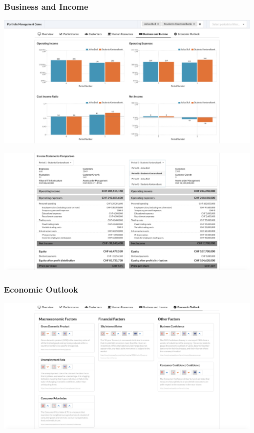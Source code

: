 \subsubsection{Business and Income}
\begin{center}
  \includegraphics[scale=0.2]{img/application-overview/reports/05_business_income.png}
\end{center}
\begin{center}
  \includegraphics[scale=0.2]{img/application-overview/reports/05_business_income_balance_sheet_comparison.png}
\end{center}

\subsubsection{Economic Outlook}
\begin{center}
  \includegraphics[scale=0.2]{img/application-overview/reports/06_economic_outlook.png}
\end{center}
